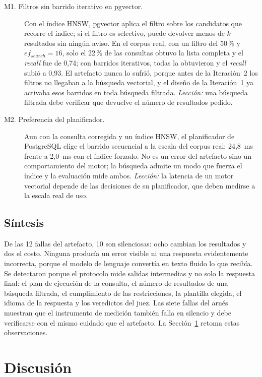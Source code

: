\begin{description}
    \item[M1. Filtros sin barrido iterativo en pgvector.] Con el índice HNSW, pgvector aplica el filtro sobre los candidatos que recorre el índice; si el filtro es selectivo, puede devolver menos de $k$ resultados sin ningún aviso. En el corpus real, con un filtro del 50\,\% y $ef_{search}=16$, solo el 22\,\% de las consultas obtuvo la lista completa y el \textit{recall} fue de 0,74; con barridos iterativos, todas la obtuvieron y el \textit{recall} subió a 0,93. El artefacto nunca lo sufrió, porque antes de la Iteración~2 los filtros no llegaban a la búsqueda vectorial, y el diseño de la Iteración~1 ya activaba esos barridos en toda búsqueda filtrada. \emph{Lección:} una búsqueda filtrada debe verificar que devuelve el número de resultados pedido.
    \item[M2. Preferencia del planificador.] Aun con la consulta corregida y un índice HNSW, el planificador de PostgreSQL elige el barrido secuencial a la escala del corpus real: 24,8~ms frente a 2,0~ms con el índice forzado. No es un error del artefacto sino un comportamiento del motor; la búsqueda admite un modo que fuerza el índice y la evaluación mide ambos. \emph{Lección:} la latencia de un motor vectorial depende de las decisiones de su planificador, que deben medirse a la escala real de uso.
\end{description}

\subsection{Síntesis}

De las 12 fallas del artefacto, 10 son silenciosas: ocho cambian los resultados y dos el costo. Ninguna producía un error visible ni una respuesta evidentemente incorrecta, porque el modelo de lenguaje convertía en texto fluido lo que recibía. Se detectaron porque el protocolo mide salidas intermedias y no solo la respuesta final: el plan de ejecución de la consulta, el número de resultados de una búsqueda filtrada, el cumplimiento de las restricciones, la plantilla elegida, el idioma de la respuesta y los veredictos del juez. Las siete fallas del arnés muestran que el instrumento de medición también falla en silencio y debe verificarse con el mismo cuidado que el artefacto. La Sección~\ref{sec:res-discusion} retoma estas observaciones.

\section{Discusión}
\label{sec:res-discusion}

